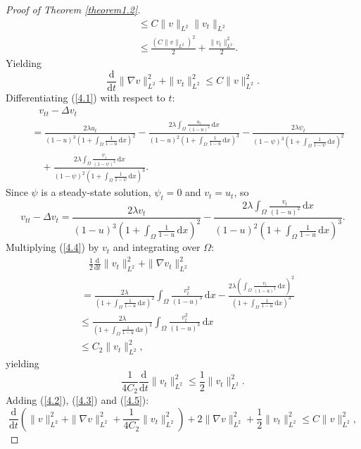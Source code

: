 \documentclass[10pt,a4paper]{amsart}
\begin{document}
\begin{proof}[Proof of Theorem \ref{theorem1.2}]
\begin{align*}
    &\ \le C\|v\|_{L^2}\|v_t\|_{L^2}\\
    &\ \le \frac{(C\|v\|_{L^2})^2}{2}+\frac{\|v_t\|_{L^2}^2}{2}.
\end{align*}
Yielding
\begin{equation}
    \frac{\mathrm{d}}{\mathrm{d}t}\|\nabla v\|_{L^2}^2+\|v_t\|_{L^2}^2\le C\|v\|_{L^2}^{2}.\label{4.3}
\end{equation}
Differentiating (\ref{4.1}) with respect to $t$:
\begin{align*}
  &\quad v_{tt}-\Delta v_t\\
  &\ =\frac{2\lambda u_t}{(1-u)^3(1+\int_{\Omega}\frac{1}{1-u}\,\mathrm{d}x)^2}-\frac{2\lambda\int_{\Omega}\frac{u_t}{(1-u)^2}\,\mathrm{d}x}{(1-u)^2(1+\int_{\Omega}\frac{1}{1-u}\,\mathrm{d}x)^3}-\frac{2\lambda \psi_t}{(1-\psi)^3(1+\int_{\Omega}\frac{1}{1-\psi}\,\mathrm{d}x)^2}\\
  &\quad\ +\frac{2\lambda\int_{\Omega}\frac{\psi_t}{(1-\psi)^2}\,\mathrm{d}x}{(1-\psi)^2(1+\int_{\Omega}\frac{1}{1-\psi}\,\mathrm{d}x)^3}.
\end{align*}
Since $\psi$ is a steady-state solution, $\psi_t=0$ and $v_t=u_t$, so
\begin{equation}
    v_{tt}-\Delta v_t=\frac{2\lambda v_t}{(1-u)^3(1+\int_{\Omega}\frac{1}{1-u}\,\mathrm{d}x)^2}-\frac{2\lambda\int_{\Omega}\frac{v_t}{(1-u)^2}\,\mathrm{d}x}{(1-u)^2(1+\int_{\Omega}\frac{1}{1-u}\,\mathrm{d}x)^3}.\label{4.4}
\end{equation}
Multiplying (\ref{4.4}) by $v_t$ and integrating over $\Omega$:
\begin{align*}
    &\quad \frac{1}{2}\frac{\mathrm{d}}{\mathrm{d}t}\|v_t\|_{L^2}^2+\|\nabla v_t\|_{L^2}^2\\
    &\ =\frac{2\lambda}{(1+\int_{\Omega}\frac{1}{1-u}\,\mathrm{d}x)^2}\int_{\Omega}\frac{v_{t}^{2}}{(1-u)^3}\,\mathrm{d}x-\frac{2\lambda(\int_{\Omega}\frac{v_t}{(1-u)^2}\,\mathrm{d}x)^2}{(1+\int_{\Omega}\frac{1}{1-u}\,\mathrm{d}x)^3}\\
    &\le \frac{2\lambda}{(1+\int_{\Omega}\frac{1}{1-u}\,\mathrm{d}x)^2}\int_{\Omega}\frac{v_{t}^{2}}{(1-u)^3}\,\mathrm{d}x\\
    &\le C_2\|v_t\|_{L^2}^{2},
\end{align*}
yielding
\begin{equation}
    \frac{1}{4C_2}\frac{\mathrm{d}}{\mathrm{d}t}\|v_t\|_{L^2}^2\le \frac{1}{2}\|v_t\|_{L^2}^{2}.\label{4.5}
\end{equation}
Adding (\ref{4.2}), (\ref{4.3}) and (\ref{4.5}):
$$\frac{\mathrm{d}}{\mathrm{d}t}\left(\|v\|_{L^2}^2+\|\nabla v\|_{L^2}^2+\frac{1}{4C_2}\|v_t\|_{L^2}^2\right)+2\|\nabla v\|_{L^2}^2+\frac{1}{2}\|v_t\|_{L^2}^2\le C\|v\|_{L^2}^{2},$$

\end{proof}
\end{document}
